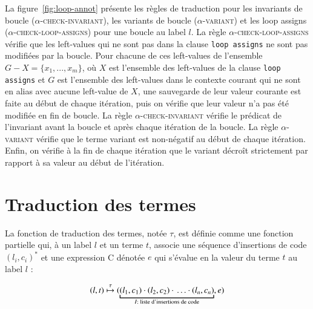 

La figure~\ref{fig:loop-annot} présente les règles de traduction pour les
invariants de boucle (\textsc{$\alpha$-check-invariant}), les variants de boucle
(\textsc{$\alpha$-variant}) et les loop assigns
(\textsc{$\alpha$-check-loop-assigns}) pour une boucle au label $l$.
La règle \textsc{$\alpha$-check-loop-assigns} vérifie que les left-values qui ne
sont pas dans la clause \lstinline'loop assigns' ne sont pas modifiées par la
boucle.
Pour chacune de ces left-values de l'ensemble $G-X = \{x_1, ..., x_m\}$, où $X$
est l'ensemble des left-values de la clause \lstinline'loop assigns' et $G$ est
l'ensemble des left-values dans le contexte courant qui ne sont en alias avec
aucune left-value de $X$, une sauvegarde de leur valeur courante est faite au
début de chaque itération, puis on vérifie que leur valeur n'a pas été modifiée
en fin de boucle.
La règle \textsc{$\alpha$-check-invariant} vérifie le prédicat de l'invariant
avant la boucle et après chaque itération de la boucle.
La règle \textsc{$\alpha$-variant} vérifie que le terme variant est non-négatif
au début de chaque itération.
Enfin, on vérifie à la fin de chaque itération que le variant décroît
strictement par rapport à sa valeur au début de l'itération.


\section{Traduction des termes \eacsl}
\label{sec:term}


La fonction de traduction des termes, notée $\tau$, est définie comme une
fonction partielle qui, à un label $l$ et un terme $t$, associe une séquence
d'insertions de code $(l_i, c_i)^*$ et une expression C dénotée $e$ qui s'évalue
en la valeur du terme $t$ au label $l$ :

\[
(l, t) \trule
(\underbracket{(l_1, c_1) \concat (l_2, c_2) \concat \ldots
  \concat (l_n, c_n)}_{I : \text{ liste d'insertions de code}}, e)
\]

